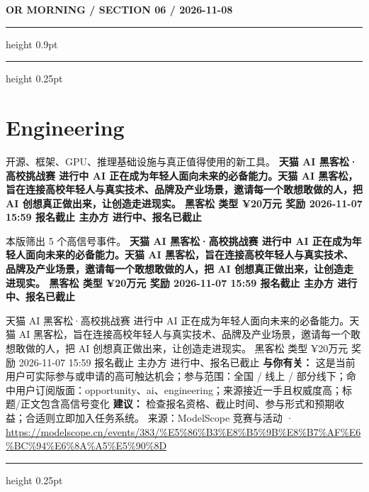 \documentclass[10.5pt]{ctexart}
\begin{document}
\newpage
{\small\bfseries OR MORNING / SECTION 06 / 2026-11-08}
\vspace{2mm}
\hrule height 0.9pt
\vspace{1.5mm}
\hrule height 0.25pt
\vspace{4mm}
\section*{Engineering}
{\color{ormuted} 开源、框架、GPU、推理基础设施与真正值得使用的新工具。}
\vspace{2mm}
{\LARGE\bfseries 天猫 AI 黑客松·高校挑战赛 进行中 AI 正在成为年轻人面向未来的必备能力。天猫 AI 黑客松，旨在连接高校年轻人与真实技术、品牌及产业场景，邀请每一个敢想敢做的人，把 AI 创想真正做出来，让创造走进现实。 黑客松 类型 ¥20万元 奖励 2026-11-07 15:59 报名截止 主办方 进行中、报名已截止}\par
\vspace{1mm}
{\color{ormuted} 本版筛出 5 个高信号事件。}
\vspace{3mm}
{\Large\bfseries 天猫 AI 黑客松·高校挑战赛 进行中 AI 正在成为年轻人面向未来的必备能力。天猫 AI 黑客松，旨在连接高校年轻人与真实技术、品牌及产业场景，邀请每一个敢想敢做的人，把 AI 创想真正做出来，让创造走进现实。 黑客松 类型 ¥20万元 奖励 2026-11-07 15:59 报名截止 主办方 进行中、报名已截止}\par
天猫 AI 黑客松·高校挑战赛 进行中 AI 正在成为年轻人面向未来的必备能力。天猫 AI 黑客松，旨在连接高校年轻人与真实技术、品牌及产业场景，邀请每一个敢想敢做的人，把 AI 创想真正做出来，让创造走进现实。 黑客松 类型 ¥20万元 奖励 2026-11-07 15:59 报名截止 主办方 进行中、报名已截止
\textbf{与你有关：} 这是当前用户可实际参与或申请的高可触达机会；参与范围：全国 / 线上 / 部分线下；命中用户订阅版面：opportunity、ai、engineering；来源接近一手且权威度高；标题/正文包含高信号变化
\textbf{建议：} 检查报名资格、截止时间、参与形式和预期收益；合适则立即加入任务系统。
{\footnotesize\color{ormuted} 来源：ModelScope 竞赛与活动 · \url{https://modelscope.cn/events/383/%E5%86%B3%E8%B5%9B%E8%B7%AF%E6%BC%94%E6%8A%A5%E5%90%8D}}
\vspace{4mm}
\hrule height 0.25pt
\vspace{3mm}
\end{document}
